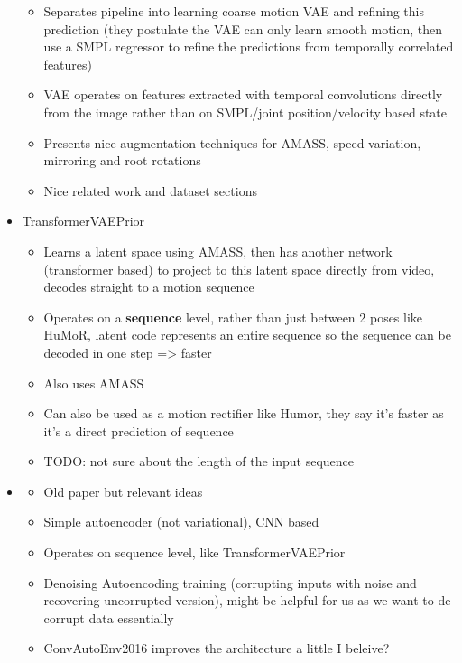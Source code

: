 \begin{itemize}
\begin{itemize}
        \item Separates pipeline into learning coarse motion VAE and refining this prediction (they postulate the VAE can only learn smooth motion, then use a SMPL regressor to refine the predictions from temporally correlated features)
        \item VAE operates on features extracted with temporal convolutions directly from the image rather than on SMPL/joint position/velocity based state
        \item Presents nice augmentation techniques for AMASS, speed variation, mirroring and root rotations
        \item Nice related work and dataset sections
    \end{itemize}
    \item TransformerVAEPrior \cite{TransformerVAEPrior}
    \begin{itemize}
        \item Learns a latent space using AMASS, then has another network (transformer based) to project to this latent space directly from video, decodes straight to a motion sequence
        \item Operates on a \textbf{sequence} level, rather than just between 2 poses like HuMoR, latent code represents an entire sequence so the sequence can be decoded in one step => faster
        \item Also uses AMASS
        \item Can also be used as a motion rectifier like Humor, they say it's faster as it's a direct prediction of sequence
        \item TODO: not sure about the length of the input sequence
    \end{itemize}
    \item \cite{ConvAutoEnv2015}
    \begin{itemize}
        \item Old paper but relevant ideas
        \item Simple autoencoder (not variational), CNN based
        \item Operates on sequence level, like TransformerVAEPrior
        \item Denoising Autoencoding training (corrupting inputs with noise and recovering uncorrupted version), might be helpful for us as we want to de-corrupt data essentially
        \item ConvAutoEnv2016 \cite{ConvAutoEnv2016} improves the architecture a little I beleive?
    \end{itemize}

\end{itemize}
